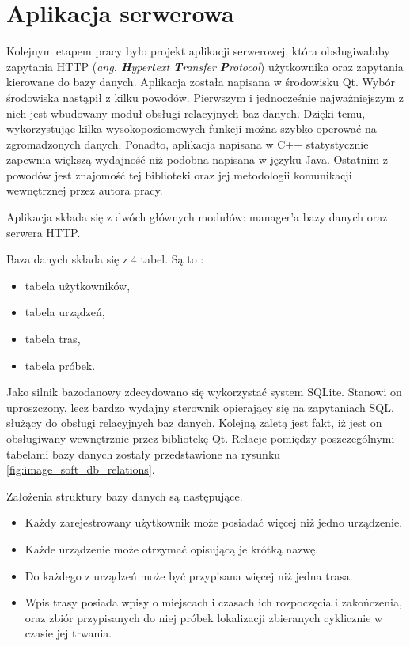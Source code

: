 \section{Aplikacja serwerowa}

Kolejnym etapem pracy było projekt aplikacji serwerowej, która obsługiwałaby zapytania HTTP (\textit{ang. \textbf{H}yper\textbf{t}ext \textbf{T}ransfer \textbf{P}rotocol}) użytkownika oraz zapytania kierowane do bazy danych. Aplikacja została napisana w środowisku Qt. Wybór środowiska nastąpił z kilku powodów. Pierwszym i jednocześnie najważniejszym z nich jest wbudowany moduł obsługi relacyjnych baz danych. Dzięki temu, wykorzystując kilka wysokopoziomowych funkcji można szybko operować na zgromadzonych danych. Ponadto, aplikacja napisana w C++ statystycznie zapewnia większą wydajność niż podobna napisana w języku Java. Ostatnim z powodów jest znajomość tej biblioteki oraz jej metodologii komunikacji wewnętrznej przez autora pracy.

Aplikacja składa się z dwóch głównych modułów: manager'a bazy danych oraz serwera HTTP.

Baza danych składa się z 4 tabel. Są to :

\begin{itemize}
\item tabela użytkowników,
\item tabela urządzeń,
\item tabela tras,
\item tabela próbek.
\end{itemize}

Jako silnik bazodanowy zdecydowano się wykorzystać system SQLite. Stanowi on uproszczony, lecz bardzo wydajny sterownik opierający się na zapytaniach SQL, służący do obsługi relacyjnych baz danych. Kolejną zaletą jest fakt, iż jest on obsługiwany wewnętrznie przez bibliotekę Qt.
Relacje pomiędzy poszczególnymi tabelami bazy danych zostały przedstawione na rysunku \ref{fig:image_soft_db_relations}.

Założenia struktury bazy danych są następujące.

\begin{itemize}
\item Każdy zarejestrowany użytkownik może posiadać więcej niż jedno urządzenie.
\item Każde urządzenie może otrzymać opisującą je krótką nazwę.
\item Do każdego z urządzeń może być przypisana więcej niż jedna trasa.
\item Wpis trasy posiada wpisy o miejscach i czasach ich rozpoczęcia i zakończenia, oraz zbiór przypisanych do niej próbek lokalizacji zbieranych cyklicznie w czasie jej trwania.
\end{itemize}

